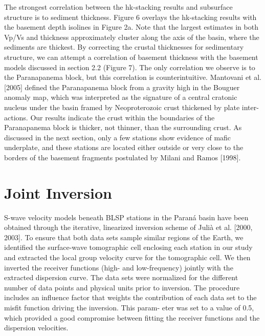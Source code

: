 \documentclass[long]{geophysics}
\begin{document}
The strongest correlation between the hk-stacking
results and subsurface structure is to sediment thickness.
Figure 6 overlays the hk-stacking results with the basement
depth isolines in Figure 2a. Note that the largest estimates in
both Vp/Vs and thickness approximately cluster along the
axis of the basin, where the sediments are thickest. By
correcting the crustal thicknesses for sedimentary structure,
we can attempt a correlation of basement thickness with the
basement models discussed in section 2.2 (Figure 7). The
only correlation we observe is to the Paranapanema block,
but this correlation is counterintuitive. Mantovani et al.
[2005] defined the Paranapanema block from a gravity high
in the Bouguer anomaly map, which was interpreted as the
signature of a central cratonic nucleus under the basin
framed by Neoproterozoic crust thickened by plate inter-
actions. Our results indicate the crust within the boundaries
of the Paranapanema block is thicker, not thinner, than the
surrounding crust. As discussed in the next section, only a
few stations show evidence of mafic underplate, and these
stations are located either outside or very close to the
borders of the basement fragments postulated by Milani
and Ramos [1998].

\section{Joint Inversion}

S-wave velocity models beneath BLSP stations in the
Paraná basin have been obtained through the iterative,
linearized inversion scheme of Julià et al. [2000, 2003].
To ensure that both data sets sample similar regions of the
Earth, we identified the surface-wave tomographic cell
enclosing each station in our study and extracted the local
group velocity curve for the tomographic cell. We then
inverted the receiver functions (high- and low-frequency)
jointly with the extracted dispersion curve. The data sets
were normalized for the different number of data points and
physical units prior to inversion. The procedure includes an
influence factor that weights the contribution of each data
set to the misfit function driving the inversion. This param-
eter was set to a value of 0.5, which provided a good
compromise between fitting the receiver functions and the
dispersion velocities.
\end{document}
